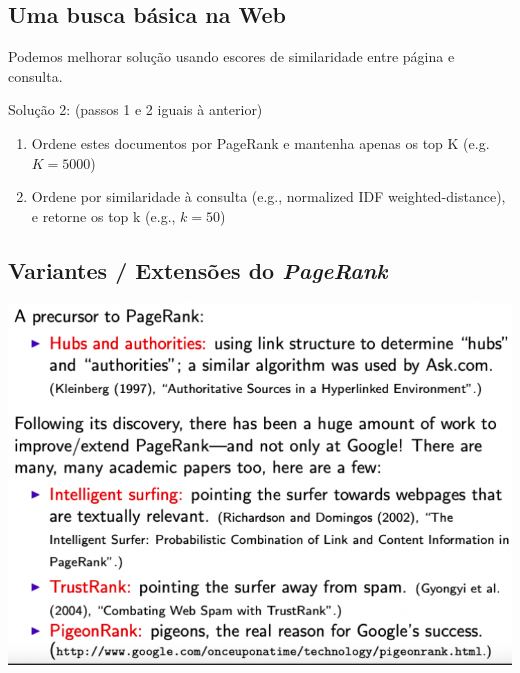 \documentclass[
  letterpaper,
  DIV=11,
  numbers=noendperiod]{scrartcl}
\providecommand{\tightlist}{%
  \setlength{\itemsep}{0pt}\setlength{\parskip}{0pt}}\usepackage{longtable,booktabs,array}
\begin{document}
\hypertarget{uma-busca-buxe1sica-na-web-1}{%
\subsection{Uma busca básica na
Web}\label{uma-busca-buxe1sica-na-web-1}}

Podemos melhorar solução usando escores de similaridade entre página e
consulta.

Solução 2: (passos 1 e 2 iguais à anterior)

\begin{enumerate}
\def\labelenumi{\arabic{enumi}.}
\setcounter{enumi}{2}
\tightlist
\item
  Ordene estes documentos por PageRank e mantenha apenas os top K
  (e.g.~\(K=5000\))
\item
  Ordene por similaridade à consulta (e.g., normalized IDF
  weighted-distance), e retorne os top k (e.g., \(k=50\))
\end{enumerate}

\hypertarget{variantes-extensuxf5es-do-pagerank}{%
\subsection{\texorpdfstring{Variantes / Extensões do
\emph{PageRank}}{Variantes / Extensões do PageRank}}\label{variantes-extensuxf5es-do-pagerank}}

\includegraphics{figs/Aula09/variantes.png}
\end{document}
